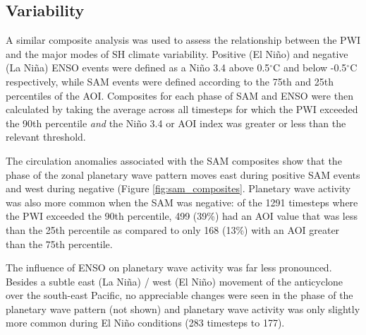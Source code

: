 \subsection{Variability}

A similar composite analysis was used to assess the relationship between the PWI and the major modes of SH climate variability. Positive (El Ni\~{n}o) and negative (La Ni\~{n}a) ENSO events were defined as a Ni\~{n}o 3.4 above 0.5$^{\circ}$C and below -0.5$^{\circ}$C respectively, while SAM events were defined according to the 75th and 25th percentiles of the AOI. Composites for each phase of SAM and ENSO were then calculated by taking the average across all timesteps for which the PWI exceeded the 90th percentile \textit{and} the Ni\~{n}o 3.4 or AOI index was greater or less than the relevant threshold. 

The circulation anomalies associated with the SAM composites show that the phase of the zonal planetary wave pattern moves east during positive SAM events and west during negative (Figure \ref{fig:sam_composites}. Planetary wave activity was also more common when the SAM was negative: of the 1291 timesteps where the PWI exceeded the 90th percentile, 499 (39\%) had an AOI value that was less than the 25th percentile as compared to only 168 (13\%) with an AOI greater than the 75th percentile. 

The influence of ENSO on planetary wave activity was far less pronounced. Besides a subtle east (La Ni\~{n}a) / west (El Ni\~{n}o) movement of the anticyclone over the south-east Pacific, no appreciable changes were seen in the phase of the planetary wave pattern (not shown) and planetary wave activity was only slightly more common during El Ni\~{n}o conditions (283 timesteps to 177).      
